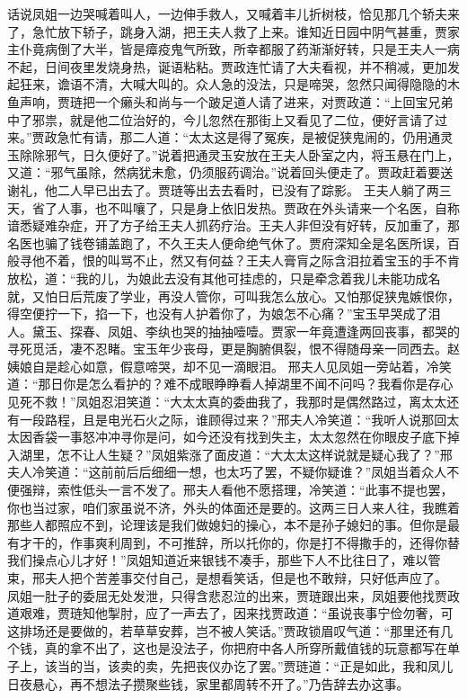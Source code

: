 \documentclass[12pt,oneside]{book}
\begin{document}
话说凤姐一边哭喊着叫人，一边伸手救人，又喊着丰儿折树枝，恰见那几个轿夫来了，急忙放下轿子，跳身入湖，把王夫人救了上来。谁知近日园中阴气甚重，贾家主仆竟病倒了大半，皆是瘴疫鬼气所致，所幸都服了药渐渐好转，只是王夫人一病不起，日间夜里发烧身热，诞语粘粘。贾政连忙请了大夫看视，并不稍减，更加发起狂来，谵语不清，大喊大叫的。众人急的没法，只是啼哭，忽然只闻得隐隐的木鱼声响，贾琏把一个癞头和尚与一个跛足道人请了进来，对贾政道：“上回宝兄弟中了邪祟，就是他二位治好的，今儿忽然在那街上又看见了二位，便好言请了过来。”贾政急忙有请，那二人道：“太太这是得了冤疾，是被促狭鬼闹的，仍用通灵玉除除邪气，日久便好了。”说着把通灵玉安放在王夫人卧室之内，将玉悬在门上，又道：“邪气虽除，然病犹未愈，仍须服药调治。”说着回头便走了。贾政赶着要送谢礼，他二人早已出去了。贾琏等出去去看时，已没有了踪影。
王夫人躺了两三天，省了人事，也不叫嚷了，只是身上依旧发热。贾政在外头请来一个名医，自称谙悉疑难杂症，开了方子给王夫人抓药疗治。王夫人非但没有好转，反加重了，那名医也骗了钱卷铺盖跑了，不久王夫人便命绝气休了。贾府深知全是名医所误，百般寻他不着，恨的叫骂不止，然又有何益？王夫人膏肓之际含泪拉着宝玉的手不肯放松，道：“我的儿，为娘此去没有其他可挂虑的，只是牵念着我儿未能功成名就，又怕日后荒废了学业，再没人管你，可叫我怎么放心。又怕那促狭鬼嫉恨你，得空便拧一下，掐一下，也没有人护着你了，为娘怎不心痛？”宝玉早哭成了泪人。黛玉、探春、凤姐、李纨也哭的抽抽噎噎。贾家一年竟遭逢两回丧事，都哭的寻死觅活，凄不忍睹。宝玉年少丧母，更是胸腑俱裂，恨不得随母亲一同西去。赵姨娘自是趁心如意，假意啼哭，却不见一滴眼泪。
邢夫人见凤姐一旁站着，冷笑道：“那日你是怎么看护的？难不成眼睁睁看人掉湖里不闻不问吗？我看你是存心见死不救！”凤姐忍泪笑道：“大太太真的委曲我了，我那时是偶然路过，离太太还有一段路程，且是电光石火之际，谁顾得过来？”邢夫人冷笑道：“我听人说那回太太因香袋一事怒冲冲寻你是问，如今还没有找到失主，太太忽然在你眼皮子底下掉入湖里，怎不让人生疑？”凤姐紫涨了面皮道：“大太太这样说就是疑心我了？”邢夫人冷笑道：“这前前后后细细一想，也太巧了罢，不疑你疑谁？”凤姐当着众人不便强辩，索性低头一言不发了。邢夫人看他不愿搭理，冷笑道：“此事不提也罢，你也当过家，咱们家虽说不济，外头的体面还是要的。这两三日人来人往，我瞧着那些人都照应不到，论理该是我们做媳妇的操心，本不是孙子媳妇的事。但你是最有才干的，作事爽利周到，不可推辞，所以托你的，你是打不得撒手的，还得你替我们操点心儿才好！”凤姐知道近来银钱不凑手，那些下人不比往日了，难以管束，邢夫人把个苦差事交付自己，是想看笑话，但是也不敢辩，只好低声应了。
凤姐一肚子的委屈无处发泄，只得含悲忍泣的出来，贾琏跟出来，凤姐要他找贾政道艰难，贾琏知他掣肘，应了一声去了，因来找贾政道：“虽说丧事宁俭勿奢，可这排场还是要做的，若草草安葬，岂不被人笑话。”贾政锁眉叹气道：“那里还有几个钱，真的拿不出了，这也是没法子，你把府中各人所穿所戴值钱的玩意都写在单子上，该当的当，该卖的卖，先把丧仪办讫了罢。”贾琏道：“正是如此，我和凤儿日夜悬心，再不想法子攒聚些钱，家里都周转不开了。”乃告辞去办这事。
\end{document}
